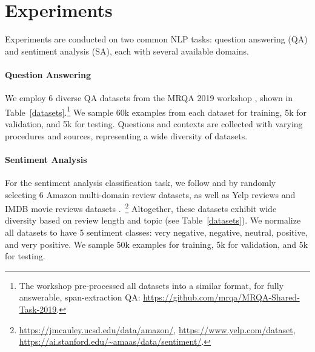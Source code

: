

\respace
\respace
\section{Experiments}
\respace
\label{sec:experiments}

Experiments are conducted on two common NLP tasks: question answering (QA) and sentiment analysis (SA), each with several available domains.

\respace
\paragraph{Question Answering} 
We employ 6 diverse QA datasets from the MRQA 2019 workshop \citep{fisch2019mrqa}, shown in Table~\ref{datasets}.\footnote{The workshop pre-processed all datasets into a similar format, for fully answerable, span-extraction QA: \url{https://github.com/mrqa/MRQA-Shared-Task-2019}.}
We sample 60k examples from each dataset for training, 5k for validation, and 5k for testing. 
Questions and contexts are collected with varying procedures and sources, representing a wide diversity of datasets.



\paragraph{Sentiment Analysis}
For the sentiment analysis classification task, we follow \citep{blitzer-etal-2007-biographies} and \citep{ruder2018strong} by randomly selecting 6 Amazon multi-domain review datasets, as well as Yelp reviews \citep{asghar2016yelp} and IMDB movie reviews datasets \citep{maas-EtAl:2011:ACL-HLT2011}.~\footnote{\url{https://jmcauley.ucsd.edu/data/amazon/}, \url{https://www.yelp.com/dataset}, \url{https://ai.stanford.edu/~amaas/data/sentiment/}.}
Altogether, these datasets exhibit wide diversity based on review length and topic (see Table~\ref{datasets}).
We normalize all datasets to have 5 sentiment classes: very negative, negative, neutral, positive, and very positive. 
We sample 50k examples for training, 5k for validation, and 5k for testing.

